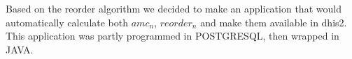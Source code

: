 Based on the reorder algorithm we decided to make an application that would automatically calculate both $amc_{n}$, $reorder_{n}$ and make them available in \gls{dhis2}. This application was partly programmed in POSTGRESQL, then wrapped in JAVA. 


%
%
%
%
%
%
